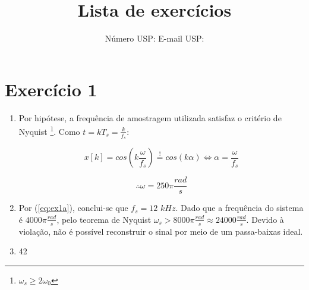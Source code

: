 \documentclass{article}
\title{Lista de exercícios \esnumber}
\author{\studentname \qquad Número USP: \uspid \qquad E-mail USP: \uspmail}
\begin{document}
\maketitle

\section*{Exercício 1}
\begin{enumerate}
\item %

Por hipótese, a frequência de amostragem utilizada satisfaz o critério de Nyquist \footnote{$\omega_s \geq 2\omega_0$}. Como $t = kT_s = \frac{k}{f_s}$:

\begin{equation}
\label{eq:ex1a}
x[k] = cos(k \frac{\omega}{f_s})  \stackrel{!}{=} cos(k \alpha) \Longleftrightarrow \alpha = \frac{\omega}{f_s}
\end{equation}

\begin{equation}
\therefore \omega = 250\pi \frac{rad}{s}
\end{equation}

\item %
Por (\ref{eq:ex1a}), conclui-se que $f_s = 12$ $kHz$. Dado que a frequência do sistema é $4000\pi \frac{rad}{s}$, pelo teorema de Nyquist $\omega_s > 8000\pi \frac{rad}{s} \approx 24000 \frac{rad}{s}$. Devido à violação, não é possível reconstruir o sinal por meio de um passa-baixas ideal. 

\item %
42

\end{enumerate}
\end{document}
